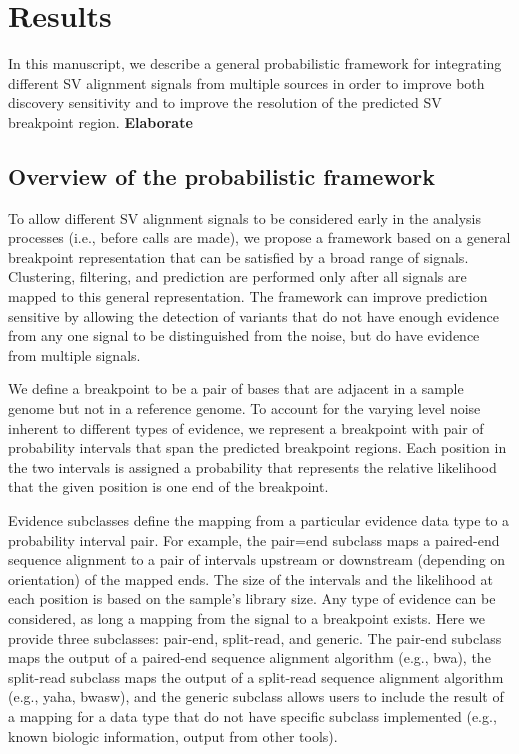 \documentclass[11pt]{article}
\begin{document}
\section{Results}

In this manuscript, we describe a general probabilistic framework for 
integrating different SV alignment signals from multiple sources in order 
to improve both discovery sensitivity and to improve the resolution of the 
predicted SV breakpoint region.
\textbf{Elaborate}

\subsection{Overview of the probabilistic framework}

To allow different SV alignment signals to be considered early in the analysis
processes (i.e., before calls are made), we propose a framework based on a
general breakpoint representation that can be satisfied by a broad range of
signals.  Clustering, filtering, and prediction are performed only after all
signals are mapped to this general representation.  The framework can improve
prediction sensitive by allowing the detection of variants that do not have
enough evidence from any one signal to be distinguished from the noise, but do
have evidence from multiple signals.

We define a breakpoint to be a pair of bases that are adjacent in a sample
genome but not in a reference genome.  To account for the varying level noise
inherent to different types of evidence, we represent a breakpoint with pair of
probability intervals that span the predicted breakpoint regions.  Each position
in the two intervals is assigned a probability that represents the relative
likelihood that the given position is one end of the breakpoint.

Evidence subclasses define the mapping from a particular evidence data type to a
probability interval pair.  For example, the pair=end subclass maps a paired-end
sequence alignment to a pair of intervals upstream or downstream (depending on
orientation) of the mapped ends.  The size of the intervals and the likelihood
at each position is based on the sample's library size.  Any type of evidence
can be considered, as long a mapping from the signal to a breakpoint exists.
Here we provide three subclasses: pair-end, split-read, and generic.  The
pair-end subclass maps the output of a paired-end sequence alignment algorithm
(e.g., bwa), the split-read subclass maps the output of a split-read sequence
alignment algorithm (e.g., yaha, bwasw), and the generic subclass allows users
to include the result of a mapping for a data type that do not have specific
subclass implemented (e.g., known biologic information, output from other
tools).
\end{document}
